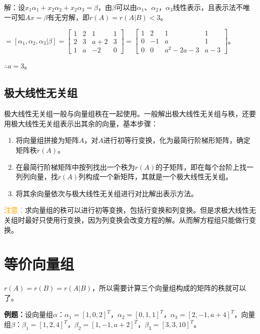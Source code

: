 \documentclass[UTF8, 12pt]{ctexart}
\begin{document}
解：设$x_1\alpha_1+x_2\alpha_2+x_2\alpha_3=\beta$，由$\beta$可以由$\alpha_1$、$\alpha_2$，$\alpha_3$线性表示，且表示法不唯一可知$Ax=\beta$有无穷解，即$r(A)=r(A|B)<3$。

$=[\alpha_1,\alpha_2,\alpha_3|\beta]=\left[\begin{array}{cccc}
    1 & 2 & 1 & 1 \\
    2 & 3 & a+2 & 3 \\
    1 & a & -2 & 0
\end{array}\right]=\left[\begin{array}{cccc}
    1 & 2 & 1 & 1 \\
    0 & -1 & a & 1 \\
    0 & 0 & a^2-2a-3 & a-3
\end{array}\right]$。

$\therefore a=3$。

\subsection{极大线性无关组}

极大线性无关组一般与向量组秩在一起使用。一般解出极大线性无关组与秩，还要用极大线性无关组表示出其余的向量，基本步骤：

\begin{enumerate}
    \item 将向量组拼接为矩阵$A$，对$A$进行初等行变换，化为最简行阶梯形矩阵，确定矩阵秩$r(A)$。
    \item 在最简行阶梯矩阵中按列找出一个秩为$r(A)$的子矩阵，即在每个台阶上找一列列向量，找$r(A)$列构成一个新矩阵，其就是一个极大线性无关组。
    \item 将其余向量依次与极大线性无关组进行对比解出表示方法。
\end{enumerate}

\textcolor{orange}{注意：}求向量组的秩可以进行初等变换，包括行变换和列变换。但是求极大线性无关组时最好只使用行变换，因为列变换会改变方程的解。从而解方程组只能做行变换。

\section{等价向量组}

$r(A)=r(B)=r(A|B)$，所以需要计算三个向量组构成的矩阵的秩就可以了。

\textbf{例题：}设向量组$\alpha$：$\alpha_1=[1,0,2]^T$，$\alpha_2=[0,1,1]^T$，$\alpha_3=[2,-1,a+4]^T$，向量组$\beta$：$\beta_1=[1,2,4]^T$，$\beta_2=[1,-1,a+2]^T$，$\beta_3=[3,3,10]^T$。
\end{document}
